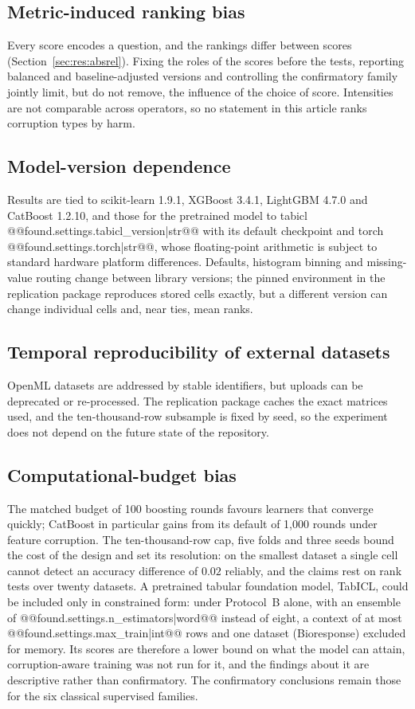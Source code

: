 \documentclass[pdflatex,sn-mathphys]{sn-jnl}
\theoremstyle{thmstyleone}
\theoremstyle{thmstyletwo}
\theoremstyle{thmstylethree}
\begin{document}
\subsection{Metric-induced ranking bias}\label{sec:threats:metric}
Every score encodes a question, and the rankings differ between scores (Section~\ref{sec:res:absrel}). Fixing the roles of the scores before the tests, reporting balanced and baseline-adjusted versions and controlling the confirmatory family jointly limit, but do not remove, the influence of the choice of score. Intensities are not comparable across operators, so no statement in this article ranks corruption types by harm.

\subsection{Model-version dependence}\label{sec:threats:version}
Results are tied to scikit-learn 1.9.1, XGBoost 3.4.1, LightGBM 4.7.0 and CatBoost 1.2.10, and those for the pretrained model to tabicl @@{found.settings.tabicl_version|str}@@ with its default checkpoint and torch @@{found.settings.torch|str}@@, whose floating-point arithmetic is subject to standard hardware platform differences. Defaults, histogram binning and missing-value routing change between library versions; the pinned environment in the replication package reproduces stored cells exactly, but a different version can change individual cells and, near ties, mean ranks.

\subsection{Temporal reproducibility of external datasets}\label{sec:threats:temporal}
OpenML datasets are addressed by stable identifiers, but uploads can be deprecated or re-processed. The replication package caches the exact matrices used, and the ten-thousand-row subsample is fixed by seed, so the experiment does not depend on the future state of the repository.

\subsection{Computational-budget bias}\label{sec:threats:budget}
The matched budget of 100 boosting rounds favours learners that converge quickly; CatBoost in particular gains from its default of 1,000 rounds under feature corruption. The ten-thousand-row cap, five folds and three seeds bound the cost of the design and set its resolution: on the smallest dataset a single cell cannot detect an accuracy difference of $0.02$ reliably, and the claims rest on rank tests over twenty datasets. A pretrained tabular foundation model, TabICL, could be included only in constrained form: under Protocol~B alone, with an ensemble of @@{found.settings.n_estimators|word}@@ instead of eight, a context of at most @@{found.settings.max_train|int}@@ rows and one dataset (Bioresponse) excluded for memory. Its scores are therefore a lower bound on what the model can attain, corruption-aware training was not run for it, and the findings about it are descriptive rather than confirmatory. The confirmatory conclusions remain those for the six classical supervised families.
\end{document}
